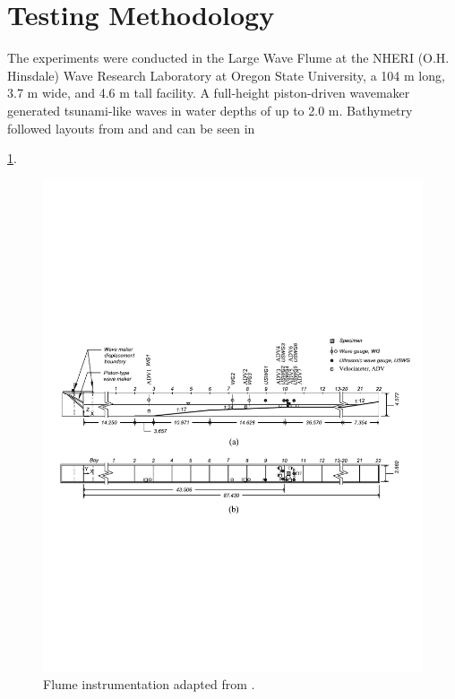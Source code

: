 \documentclass{article}
\begin{document}
\section{Testing Methodology}
The experiments were conducted in the Large Wave Flume at the NHERI (O.H. Hinsdale) Wave Research Laboratory at Oregon State University, a 104 m long, 3.7 m wide, and 4.6 m tall facility. A full-height piston-driven wavemaker generated tsunami-like waves in water depths of up to 2.0 m. Bathymetry followed layouts from \citep{winterTsunamiLikeWaveForces2020} and \citep{Shekhar2020} and can be seen in {\ref{fig:waveflume}.
 
\begin{figure}[htbp]
  \centering
  \includegraphics[width=1.2\textwidth]{WaveFlume.pdf}
  \caption{ Flume instrumentation adapted from \citep{winterTsunamiLikeWaveForces2020}.}
  \label{fig:waveflume}
\end{figure}

}
\end{document}
